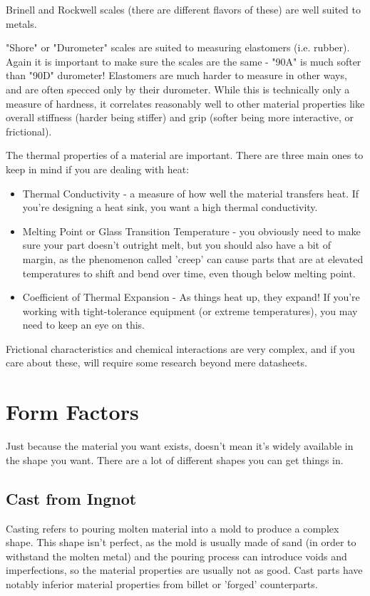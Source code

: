 \documentclass[10pt,letterpaper]{book}
\begin{document}
 Brinell and Rockwell scales (there are different flavors of these) are well suited to metals.
 
 "Shore" or "Durometer" scales are suited to measuring elastomers (i.e. rubber). Again it is important to make sure the scales are the same - "90A" is much softer than "90D" durometer! Elastomers are much harder to measure in other ways, and are often specced only by their durometer. While this is technically only a measure of hardness, it correlates reasonably well to other material properties like overall stiffness (harder being stiffer) and grip (softer being more interactive, or frictional).
 
 The thermal properties of a material are important. There are three main ones to keep in mind if you are dealing with heat:
 \begin{itemize}
 	\item Thermal Conductivity - a measure of how well the material transfers heat. If you're designing a heat sink, you want a high thermal conductivity.
 	\item Melting Point or Glass Transition Temperature - you obviously need to make sure your part doesn't outright melt, but you should also have a bit of margin, as the phenomenon called 'creep' can cause parts that are at elevated temperatures to shift and bend over time, even though below melting point.
 	\item Coefficient of Thermal Expansion - As things heat up, they expand! If you're working with tight-tolerance equipment (or extreme temperatures), you may need to keep an eye on this.
 \end{itemize}
  
 Frictional characteristics and chemical interactions are very complex, and if you care about these, will require some research beyond mere datasheets.
 
 \section{Form Factors}
 
 Just because the material you want exists, doesn't mean it's widely available in the shape you want. There are a lot of different shapes you can get things in.
 
 \subsection{Cast from Ingnot}
 
 Casting refers to pouring molten material into a mold to produce a complex shape. This shape isn't perfect, as the mold is usually made of sand (in order to withstand the molten metal) and the pouring process can introduce voids and imperfections, so the material properties are usually not as good. Cast parts have notably inferior material properties from billet or 'forged' counterparts.
 
\end{document}
